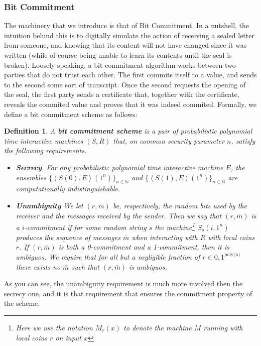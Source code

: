 \documentclass{article}
\newtheorem{definition}{Definition}
\begin{document}
\subsubsection{Bit Commitment}
The machinery that we introduce is that of Bit Commitment. In a nutshell, the intuition behind this
is to digitally simulate the action of receiving a sealed letter from someone, and knowing that its content will not have changed since it was written (while of course being unable to learn its contents until the seal is broken).
Loosely speaking, a bit commitment algorithm works between two parties that do not trust each other.
The first commits itself to a value, and sends to the second some sort of transcript. 
Once the second requests the opening of the seal, the first party sends a certificate that, together with the certificate, reveals the commited value and proves that it was indeed commited.
Formally, we define a bit commitment scheme as follows:
\begin{definition}
    A \textbf{bit commitment scheme} is a pair of probabilistic polynomial time interactive machines $(S, R)$ that,
    on common security parameter $n$, satisfy the following requirements.
    \begin{itemize}
        \item \textbf{Secrecy}. For any probabilistic polynomial time interactive machine $E$, 
            the ensembles $\{ \left<S(0), E\right>(1^n) \}_{n \in \mathbb{N}}$ and $\{ \left<S(1), E\right>(1^n) \}_{n \in \mathbb{N}}$ are computationally indistinguishable.
        \item \textbf{Unambiguity} We let $(r, \bar{m})$ be, respectively, the random bits used by the receiver and the messages received by the sender. 
                Then we say that $(r, \bar{m})$ is a $i$-commitment if for some random string $s$ the machine\footnote{Here we use the notation $M_r(x)$ to denote the machine $M$ running with local coins $r$ on input $x$} $S_s(i, 1^n)$ produces the sequence of messages $\bar{m}$ when interacting with $R$ with local coins $r$. 
                If $(r, \bar{m})$ is both a 0-commitment and a 1-commitment, then it is ambiguos. 
                We require that for all but a negligible fraction of $r \in {0, 1}^{\text{poly(n)}}$ there exists no $\bar{m}$ such that $(r, \bar{m})$ is ambiguos.
    \end{itemize}
\end{definition}
As you can see, the unambiguity requirement is much more involved then the secrecy one, and it is that requirement that ensures the commitment property of the scheme.
\end{document}
